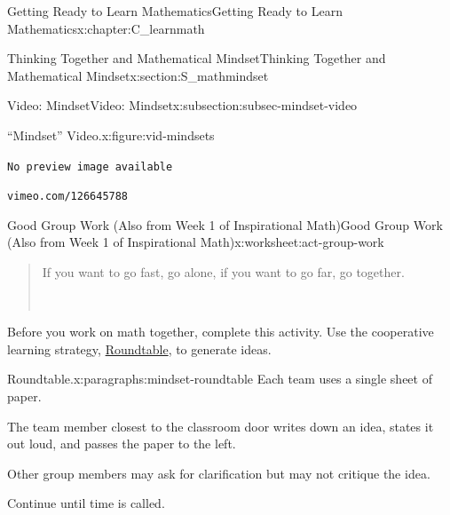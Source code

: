 \documentclass[oneside,10pt,]{book}
\newcommand{\mono}[1]{\texttt{#1}}
\numberwithin{equation}{chapter}
\newlength{\qrsize}
\newlength{\previewwidth}
\begin{document}
\begin{chapterptx}{Getting Ready to Learn Mathematics}{}{Getting Ready to Learn Mathematics}{}{}{x:chapter:C_learnmath}
\begin{sectionptx}{Thinking Together and Mathematical Mindset}{}{Thinking Together and Mathematical Mindset}{}{}{x:section:S_mathmindset}
\begin{subsectionptx}{Video: Mindset}{}{Video: Mindset}{}{}{x:subsection:subsec-mindset-video}
\begin{figureptx}{``Mindset'' Video.}{x:figure:vid-mindsets}{}
\begin{tcbraster}[raster columns=2, raster column skip=1pt, raster halign=center, raster force size=false, raster left skip=0pt, raster right skip=0pt]
\begin{tcolorbox}[previewstyle, width=\previewwidth]%
\mono{No preview image available}%
\end{tcolorbox}%
\begin{tcolorbox}[qrstyle]%
{\hypersetup{urlcolor=black}}%
\end{tcolorbox}%
\begin{tcolorbox}[captionstyle]%
\small \mono{vimeo.com/126645788}\end{tcolorbox}%
\end{tcbraster}%
\tcblower
\end{figureptx}%
\end{subsectionptx}
%
%
\typeout{************************************************}
\typeout{************************************************}
%
\begin{worksheet-subsection}{Good Group Work (Also from Week 1 of Inspirational Math)}{}{Good Group Work (Also from Week 1 of Inspirational Math)}{}{}{x:worksheet:act-group-work}
\begin{introduction}{}%
\begin{quote}%
If you want to go fast, go alone, if you want to go far, go together.%
\nopagebreak\par%
\hfill{}\\\par
\end{quote}
Before you work on math together, complete this activity. Use the cooperative learning strategy, \hyperlink{x:paragraphs:mindset-roundtable}{Roundtable}, to generate ideas.%
\end{introduction}%
\begin{paragraphs}{Roundtable.}{x:paragraphs:mindset-roundtable}%
Each team uses a single sheet of paper.%
\par
The team member closest to the classroom door writes down an idea, states it out loud, and passes the paper to the left.%
\par
Other group members may ask for clarification but may not critique the idea.%
\par
Continue until time is called.%
\end{paragraphs}%

\end{worksheet-subsection}
\end{sectionptx}
\end{chapterptx}
\end{document}
